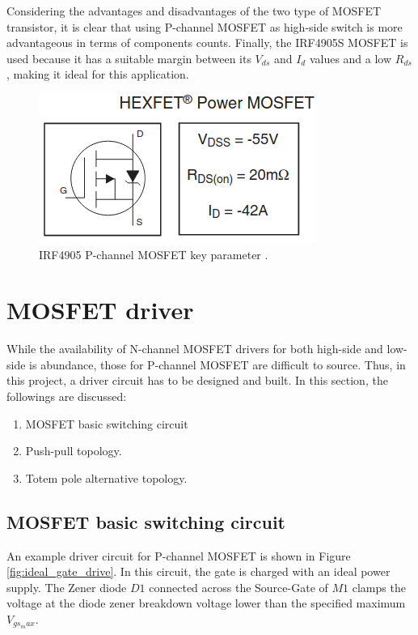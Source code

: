 \documentclass[main.tex]{subfiles}
\begin{document}
    \justify
    Considering the advantages and disadvantages of the two type of MOSFET transistor, it is clear that using P-channel MOSFET as high-side switch is more advantageous in terms of components counts. Finally, the IRF4905S MOSFET is used because it has a suitable margin between its $V_{ds}$ and $I_{d}$ values and a low $R_{ds}$, making it ideal for this application. 

    \begin{figure}[!h]
        \centerline{\includegraphics[scale=0.5]{media/IRF4905_key_parameters.png}}
        \caption{IRF4905 P-channel MOSFET key parameter \cite{IRF4905S}.}
        \label{fig:IRF4905S_param}
    \end{figure}    
    
    \pagebreak
    \section{MOSFET driver}
    \justify
    While the availability of N-channel MOSFET drivers for both high-side and low-side is abundance, those for P-channel MOSFET are difficult to source. Thus, in this project, a driver circuit has to be designed and built. In this section, the followings are discussed:
    \begin{enumerate}
        \item MOSFET basic switching circuit
        \item Push-pull topology.
        \item Totem pole alternative topology.
    \end{enumerate}   

    \pagebreak
    \subsection{MOSFET basic switching circuit} 
    \justify
    An example driver circuit for P-channel MOSFET is shown in Figure \ref{fig:ideal_gate_drive}. In this circuit, the gate is charged with an ideal power supply. The Zener diode $D1$ connected across the Source-Gate of $M1$ clamps the voltage at the diode zener breakdown voltage lower than the specified maximum $V_{gs_max}$.
\end{document}
